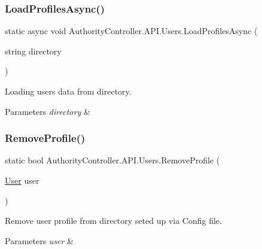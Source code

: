 \subsubsection{\texorpdfstring{Load\+Profiles\+Async()}{LoadProfilesAsync()}}
{\footnotesize\ttfamily static async void Authority\+Controller.\+A\+P\+I.\+Users.\+Load\+Profiles\+Async (\begin{DoxyParamCaption}\item[{string}]{directory }\end{DoxyParamCaption})\hspace{0.3cm}{\ttfamily [static]}}



Loading users data from directory. 


\begin{DoxyParams}{Parameters}
{\em directory} & \\
\hline
\end{DoxyParams}
\mbox{\label{class_authority_controller_1_1_a_p_i_1_1_users_a7239ac583f20a03adc376681494b82bb}} 
\subsubsection{\texorpdfstring{Remove\+Profile()}{RemoveProfile()}\hspace{0.1cm}{\footnotesize\ttfamily [1/2]}}
{\footnotesize\ttfamily static bool Authority\+Controller.\+A\+P\+I.\+Users.\+Remove\+Profile (\begin{DoxyParamCaption}\item[{\mbox{\hyperlink{class_authority_controller_1_1_data_1_1_personal_1_1_user}{User}}}]{user }\end{DoxyParamCaption})\hspace{0.3cm}{\ttfamily [static]}}



Remove user profile from directory seted up via Config file. 


\begin{DoxyParams}{Parameters}
{\em user} & \\
\hline
\end{DoxyParams}
\mbox{\label{class_authority_controller_1_1_a_p_i_1_1_users_aa57a37410c6bc6a47ee79c0d3438b028}} 
